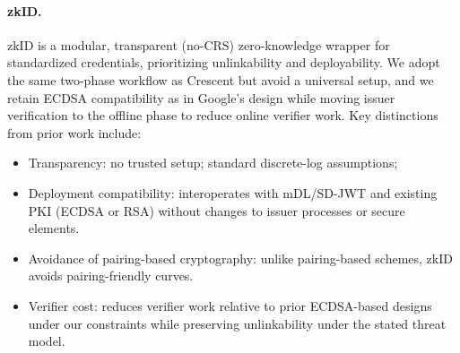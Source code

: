 \paragraph{zkID.}
zkID is a modular, transparent (no-CRS) zero-knowledge wrapper for standardized credentials, prioritizing unlinkability and deployability. We adopt the same two-phase workflow as Crescent but avoid a universal setup, and we retain ECDSA compatibility as in Google’s design while moving issuer verification to the offline phase to reduce online verifier work. Key distinctions from prior work include:
\begin{itemize}
  \item Transparency: no trusted setup; standard discrete-log assumptions; 
  \item Deployment compatibility: interoperates with mDL/SD-JWT and existing PKI (ECDSA or RSA) without changes to issuer processes or secure elements.
  \item Avoidance of pairing-based cryptography: unlike pairing-based schemes, zkID avoids pairing-friendly curves.
  \item Verifier cost: reduces verifier work relative to prior ECDSA-based designs under our constraints while preserving unlinkability under the stated threat model.
\end{itemize}

